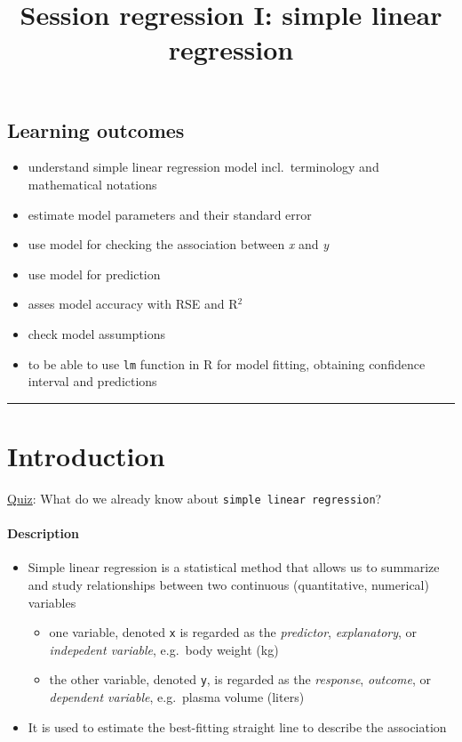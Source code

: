 \documentclass[]{article}
\title{Session regression I: simple linear regression}
\author{}
\date{}
\providecommand{\tightlist}{%
  \setlength{\itemsep}{0pt}\setlength{\parskip}{0pt}}
\let\oldparagraph\paragraph
\renewcommand{\paragraph}[1]{\oldparagraph{#1}\mbox{}}
\begin{document}
\maketitle

\hypertarget{learning-outcomes}{%
\subsection{Learning outcomes}\label{learning-outcomes}}

\begin{itemize}
\tightlist
\item
  understand simple linear regression model incl.~terminology and
  mathematical notations
\item
  estimate model parameters and their standard error
\item
  use model for checking the association between \emph{x} and \emph{y}
\item
  use model for prediction
\item
  asses model accuracy with RSE and R\(^2\)
\item
  check model assumptions
\item
  to be able to use \texttt{lm} function in R for model fitting,
  obtaining confidence interval and predictions
\end{itemize}

\begin{center}\rule{0.5\linewidth}{\linethickness}\end{center}

\hypertarget{introduction}{%
\section{Introduction}\label{introduction}}

\href{https://forms.gle/bHZr1MP454npysAFA}{Quiz}: What do we already
know about \texttt{simple\ linear\ regression}?

\hypertarget{description}{%
\paragraph{Description}\label{description}}

\begin{itemize}
\tightlist
\item
  Simple linear regression is a statistical method that allows us to
  summarize and study relationships between two continuous
  (quantitative, numerical) variables

  \begin{itemize}
  \tightlist
  \item
    one variable, denoted \texttt{x} is regarded as the
    \emph{predictor}, \emph{explanatory}, or \emph{indepedent variable},
    e.g.~body weight (kg)
  \item
    the other variable, denoted \texttt{y}, is regarded as the
    \emph{response}, \emph{outcome}, or \emph{dependent variable},
    e.g.~plasma volume (liters)
  \end{itemize}
\item
  It is used to estimate the best-fitting straight line to describe the
  association
\end{itemize}
\end{document}
